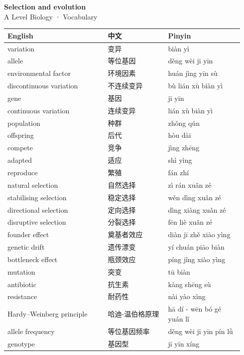 \documentclass[11pt]{article}
\begin{document}
\begin{center}
  {\LARGE\bfseries Selection and evolution}\\[0.35em]
  {\large A Level Biology · Vocabulary}
\end{center}
\vspace{0.6em}

\begin{longtable}{@{}p{0.40\linewidth}p{0.24\linewidth}p{0.30\linewidth}@{}}
\toprule
\textbf{English} & \textbf{中文} & \textbf{Pinyin} \\
\midrule
\endhead
\bottomrule
\endlastfoot
variation & 变异 & biàn yì \\
allele & 等位基因 & děng wèi jī yīn \\
environmental factor & 环境因素 & huán jìng yīn sù \\
discontinuous variation & 不连续变异 & bù lián xù biàn yì \\
gene & 基因 & jī yīn \\
continuous variation & 连续变异 & lián xù biàn yì \\
population & 种群 & zhǒng qún \\
offspring & 后代 & hòu dài \\
compete & 竞争 & jìng zhēng \\
adapted & 适应 & shì yìng \\
reproduce & 繁殖 & fán zhí \\
natural selection & 自然选择 & zì rán xuǎn zé \\
stabilising selection & 稳定选择 & wěn dìng xuǎn zé \\
directional selection & 定向选择 & dìng xiàng xuǎn zé \\
disruptive selection & 分裂选择 & fēn liè xuǎn zé \\
founder effect & 奠基者效应 & diàn jī zhě xiào yìng \\
genetic drift & 遗传漂变 & yí chuán piāo biàn \\
bottleneck effect & 瓶颈效应 & píng jǐng xiào yìng \\
mutation & 突变 & tū biàn \\
antibiotic & 抗生素 & kàng shēng sù \\
resistance & 耐药性 & nài yào xìng \\
Hardy–Weinberg principle & 哈迪-温伯格原理 & hā dí - wēn bó gé yuán lǐ \\
allele frequency & 等位基因频率 & děng wèi jī yīn pín lǜ \\
genotype & 基因型 & jī yīn xíng \\

\end{longtable}
\end{document}
